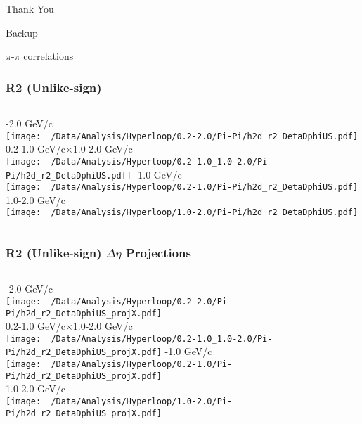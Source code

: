 \documentclass{beamer}
\begin{document}
\begin{frame}
	\centering\Huge Thank You
\end{frame}
\begin{frame}
	\LARGE Backup
\end{frame}
\begin{frame}
	\LARGE $\pi$-$\pi$ correlations
\end{frame}
\begin{frame}
	\frametitle{R2 (Unlike-sign)}
	\begin{columns}
		-2.0 GeV/c\\
		\texttt{[image: ~/Data/Analysis/Hyperloop/0.2-2.0/Pi-Pi/h2d\_r2\_DetaDphiUS.pdf]}\\0.2-1.0 GeV/c$\times$1.0-2.0 GeV/c\\
		\texttt{[image: ~/Data/Analysis/Hyperloop/0.2-1.0\_1.0-2.0/Pi-Pi/h2d\_r2\_DetaDphiUS.pdf]}
		-1.0 GeV/c\\
		\texttt{[image: ~/Data/Analysis/Hyperloop/0.2-1.0/Pi-Pi/h2d\_r2\_DetaDphiUS.pdf]}\\1.0-2.0 GeV/c\\
		\texttt{[image: ~/Data/Analysis/Hyperloop/1.0-2.0/Pi-Pi/h2d\_r2\_DetaDphiUS.pdf]}
	\end{columns}
\end{frame}
\begin{frame}
	\frametitle{R2 (Unlike-sign) $\Delta\eta$ Projections}
	\begin{columns}
		\column{0.5\textwidth}
		-2.0 GeV/c\\
		\texttt{[image: ~/Data/Analysis/Hyperloop/0.2-2.0/Pi-Pi/h2d\_r2\_DetaDphiUS\_projX.pdf]}\\0.2-1.0 GeV/c$\times$1.0-2.0 GeV/c\\
		\texttt{[image: ~/Data/Analysis/Hyperloop/0.2-1.0\_1.0-2.0/Pi-Pi/h2d\_r2\_DetaDphiUS\_projX.pdf]}
		\column{0.5\textwidth}
		-1.0 GeV/c\\
		\texttt{[image: ~/Data/Analysis/Hyperloop/0.2-1.0/Pi-Pi/h2d\_r2\_DetaDphiUS\_projX.pdf]}\\1.0-2.0 GeV/c\\
		\texttt{[image: ~/Data/Analysis/Hyperloop/1.0-2.0/Pi-Pi/h2d\_r2\_DetaDphiUS\_projX.pdf]}
	\end{columns}
\end{frame}
\end{document}
